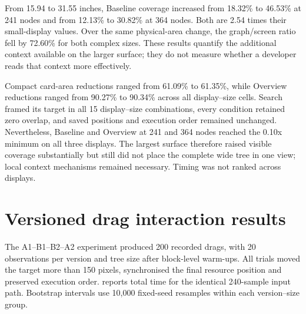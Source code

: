 \begin{table}[htbp]
\centering
\caption{Complex-tree coverage across three physical display sizes. Resolution is audit metadata, not the treatment.}
\label{tab:physicalscreens}
\small
{}
\end{table}

From 15.94 to 31.55 inches, Baseline coverage increased from 18.32\% to 46.53\% at 241 nodes and from 12.13\% to 30.82\% at 364 nodes. Both are 2.54 times their small-display values. Over the same physical-area change, the graph/screen ratio fell by 72.60\% for both complex sizes. These results quantify the additional context available on the larger surface; they do not measure whether a developer reads that context more effectively.

Compact card-area reductions ranged from 61.09\% to 61.35\%, while Overview reductions ranged from 90.27\% to 90.34\% across all display--size cells. Search framed its target in all 15 display--size combinations, every condition retained zero overlap, and saved positions and execution order remained unchanged. Nevertheless, Baseline and Overview at 241 and 364 nodes reached the 0.10x minimum on all three displays. The largest surface therefore raised visible coverage substantially but still did not place the complete wide tree in one view; local context mechanisms remained necessary. Timing was not ranked across displays.

\section{Versioned drag interaction results}

The A1--B1--B2--A2 experiment produced 200 recorded drags, with 20 observations per version and tree size after block-level warm-ups. All trials moved the target more than 150 pixels, synchronised the final resource position and preserved execution order.  reports total time for the identical 240-sample input path. Bootstrap intervals use 10,000 fixed-seed resamples within each version--size group.

